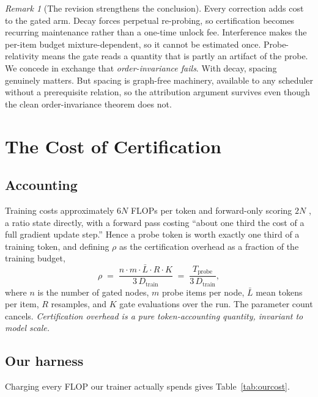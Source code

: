 \documentclass[11pt]{article}
\theoremstyle{plain}
\theoremstyle{definition}
\theoremstyle{remark}
\newtheorem{remark}{Remark}
\begin{document}
\begin{remark}[The revision strengthens the conclusion]
Every correction adds cost to the gated arm. Decay forces perpetual
re-probing, so certification becomes recurring maintenance rather than a one-time
unlock fee. Interference makes the per-item budget mixture-dependent, so it
cannot be estimated once. Probe-relativity means the gate reads a quantity that
is partly an artifact of the probe. We concede in exchange that
\emph{order-invariance fails}. With decay, spacing genuinely matters. But spacing
is graph-free machinery, available to any scheduler without a prerequisite
relation, so the attribution argument survives even though the clean
order-invariance theorem does not.
\end{remark}

\section{The Cost of Certification}
\label{sec:probecost}

\subsection{Accounting}

Training costs approximately $6N$ FLOPs per token and forward-only scoring $2N$
\citep{kaplan2020scaling,hoffmann2022training}, a ratio \citet{biderman2023emergent}
state directly, with a forward pass costing ``about one third the cost of a full
gradient update step.'' Hence a probe token is worth exactly one third of a
training token, and defining $\rho$ as the certification overhead as a fraction
of the training budget,
\begin{equation}
\rho \;=\; \frac{n \cdot m \cdot \bar{L} \cdot R \cdot K}{3\,D_{\text{train}}}
\;=\; \frac{T_{\text{probe}}}{3\,D_{\text{train}}},
\label{eq:rho}
\end{equation}
where $n$ is the number of gated nodes, $m$ probe items per node, $\bar{L}$ mean
tokens per item, $R$ resamples, and $K$ gate evaluations over the run. The
parameter count cancels. \emph{Certification overhead is a pure token-accounting
quantity, invariant to model scale.}

\subsection{Our harness}

Charging every FLOP our trainer actually spends gives Table~\ref{tab:ourcost}.
\end{document}
